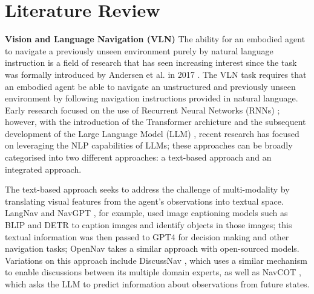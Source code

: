 \documentclass{svproc}
\begin{document}
\section{Literature Review}
    \textbf{Vision and Language Navigation (VLN)}  The ability for an embodied agent to navigate a previously unseen environment purely by natural language instruction is a field of research that has seen increasing interest since the task was formally introduced by Andersen et al. in 2017 \cite{8578485}. The VLN task requires that an embodied agent be able to navigate an unstructured and previously unseen environment by following navigation instructions provided in natural language. Early research focused on the use of Recurrent Neural Networks (RNNs) \cite{8578485, 8954045, 8953608}; however, with the introduction of the Transformer archicture \cite{attenion_is_all_you_need} and the subsequent development of the Large Language Model (LLM) \cite{radford2018improving, touvron2023llamaopenefficientfoundation}, recent research has focused on leveraging the NLP capabilities of LLMs; these approaches can be broadly categorised into two different approaches: a text-based approach and an integrated approach.
    \par The text-based approach seeks to address the challenge of multi-modality by translating visual features from the agent's observations into textual space. LangNav \cite{pan2024langnavlanguageperceptualrepresentation} and NavGPT \cite{zhou2023navgptexplicitreasoningvisionandlanguage}, for example, used image captioning models such as BLIP \cite{li2022blipbootstrappinglanguageimagepretraining, li2023blip2bootstrappinglanguageimagepretraining} and DETR \cite{zhu2021deformabledetrdeformabletransformers} to caption images and identify objects in those images; this textual information was then passed to GPT4 for decision making and other navigation tasks; OpenNav \cite{open-nav} takes a similar approach with open-sourced models. Variations on this approach include DiscussNav \cite{long2023_discussnav}, which uses a similar mechanism to enable discussions between its multiple domain experts, as well as NavCOT \cite{lin2024navcotboostingllmbasedvisionandlanguage}, which asks the LLM to predict information about observations from future states.
    
\end{document}

